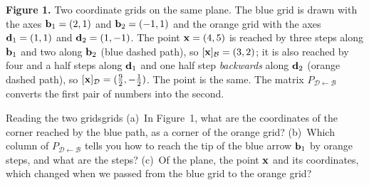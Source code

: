 \documentclass[11pt]{article}
\begin{document}
\begin{center}
\end{center}

\textbf{Figure 1.} Two coordinate grids on the same plane. The blue grid is drawn with the axes $\mathbf{b}_1=(2,1)$ and $\mathbf{b}_2=(-1,1)$ and the orange grid with the axes $\mathbf{d}_1=(1,1)$ and $\mathbf{d}_2=(1,-1)$. The point $\mathbf{x}=(4,5)$ is reached by three steps along $\mathbf{b}_1$ and two along $\mathbf{b}_2$ (blue dashed path), so $[\mathbf{x}]_{\mathcal{B}}=(3,2)$; it is also reached by four and a half steps along $\mathbf{d}_1$ and one half step \emph{backwards} along $\mathbf{d}_2$ (orange dashed path), so $[\mathbf{x}]_{\mathcal{D}}=(\tfrac92,-\tfrac12)$. The point is the same. The matrix $P_{\mathcal{D}\leftarrow\mathcal{B}}$ converts the first pair of numbers into the second.

\begin{think}{Reading the two grids}{grids}
(a)~In Figure~1, what are the coordinates of the corner reached by the blue path, as a corner of the orange grid? (b)~Which column of $P_{\mathcal{D}\leftarrow\mathcal{B}}$ tells you how to reach the tip of the blue arrow $\mathbf{b}_1$ by orange steps, and what are the steps? (c)~Of the plane, the point $\mathbf{x}$ and its coordinates, which changed when we passed from the blue grid to the orange grid?
\end{think}
\end{document}
